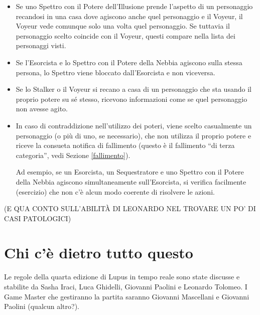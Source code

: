 \documentclass[a4paper,10pt]{article}
\begin{document}
\begin{itemize}
 \item Se uno Spettro con il Potere dell'Illusione prende l'aspetto di un personaggio recandosi in una casa dove agiscono anche quel personaggio e il Voyeur, il Voyeur vede comunque solo una volta quel personaggio. Se tuttavia il personaggio scelto coincide con il Voyeur, questi compare nella lista dei personaggi visti.

 \item Se l'Esorcista e lo Spettro con il Potere della Nebbia agiscono sulla stessa persona, lo Spettro viene bloccato dall'Esorcista e non viceversa.
 
 \item Se lo Stalker o il Voyeur si recano a casa di un personaggio che sta usando il proprio potere su sé stesso, ricevono informazioni come se quel personaggio non avesse agito.
 
 \item In caso di contraddizione nell'utilizzo dei poteri, viene scelto casualmente un personaggio (o più di uno, se necessario), che non utilizza il proprio potere e riceve la consueta notifica di fallimento (questo è il fallimento ``di terza categoria'', vedi Sezione \ref{fallimento}).
 
 Ad esempio, se un Esorcista, un Sequestratore e uno Spettro con il Potere della Nebbia agiscono simultaneamente sull'Esorcista, si verifica facilmente (esercizio) che non c'è alcun modo coerente di risolvere le azioni.
 
\end{itemize}


(E QUA CONTO SULL'ABILITÀ DI LEONARDO NEL TROVARE UN PO' DI CASI PATOLOGICI)



\section{Chi c'è dietro tutto questo}

Le regole della quarta edizione di Lupus in tempo reale sono state discusse e stabilite da Sasha Iraci, Luca Ghidelli, Giovanni Paolini e Leonardo Tolomeo.
I Game Master che gestiranno la partita saranno Giovanni Mascellani e Giovanni Paolini (qualcun altro?).
\end{document}
